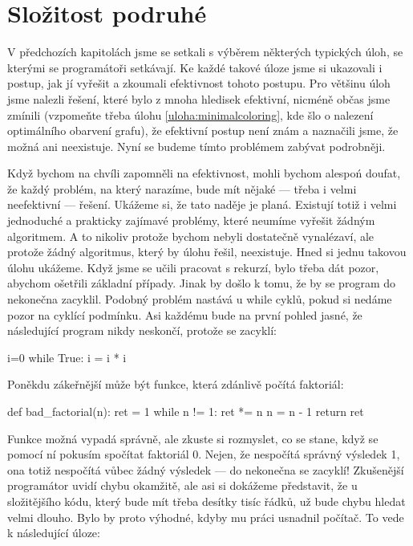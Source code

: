 \ifx\ucebnice\undefined

\setcounter{section}{5}
\fi
\section{Složitost podruhé}
V předchozích kapitolách jsme se setkali s výběrem některých typických úloh, se kterými
se programátoři setkávají. Ke každé takové úloze jsme si ukazovali i postup, jak jí vyřešit
a zkoumali efektivnost tohoto postupu. Pro většinu úloh jsme nalezli řešení, které bylo
z mnoha hledisek efektivní, nicméně občas jsme zmínili (vzpomeňte třeba
úlohu \ref{uloha:minimalcoloring}, kde šlo o nalezení optimálního obarvení grafu), že 
efektivní postup není znám a naznačili jsme, že možná ani neexistuje. Nyní se
budeme tímto problémem zabývat podrobněji. 

Když bychom na chvíli zapomněli na efektivnost, mohli bychom alespoń doufat, že každý problém, na který
narazíme, bude mít nějaké --- třeba i velmi neefektivní --- řešení. Ukážeme si, že tato naděje
je planá. Existují totiž i velmi jednoduché a prakticky zajímavé problémy, které neumíme
vyřešit žádným algoritmem. A to nikoliv protože bychom nebyli dostatečně vynalézaví, ale protože
žádný algoritmus, který by úlohu řešil, neexistuje. Hned si jednu takovou úlohu ukážeme. Když jsme 
se učili pracovat s rekurzí, bylo třeba dát pozor, abychom ošetřili základní případy. Jinak by 
došlo k tomu, že by se program do nekonečna zacyklil. Podobný problém nastává u while cyklů, 
pokud si nedáme pozor na cyklící podmínku. Asi každému bude na první pohled jasné, že následující 
program nikdy neskončí, protože se zacyklí:

\begin{python}
i=0
while True:
   i = i * i 
\end{python}

Poněkdu zákeřnější může být funkce, která zdánlivě počítá faktoriál:

\begin{python}
def bad_factorial(n):
    ret = 1
    while n != 1:
        ret *= n
        n = n - 1
    return ret
\end{python}

Funkce možná vypadá správně, ale zkuste si rozmyslet, co se stane, když se pomocí ní pokusím spočítat
faktoriál 0. Nejen, že nespočítá správný výsledek 1, ona totiž nespočítá vůbec žádný výsledek ---
do nekonečna se zacyklí! Zkušenější programátor uvidí chybu okamžitě, ale asi si dokážeme představit,
že u složitějšího kódu, který bude mít třeba desítky tisíc řádků, už bude chybu hledat velmi dlouho.
Bylo by proto výhodné, kdyby mu práci usnadnil počítač. To vede k následující úloze:

